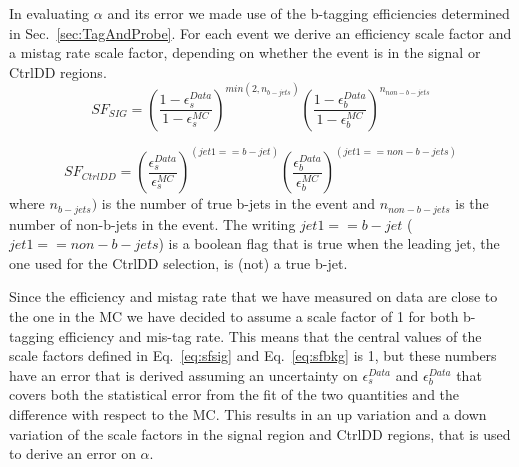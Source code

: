 In evaluating $\alpha$ and its error we made use of the b-tagging efficiencies determined in Sec.~\ref{sec:TagAndProbe}. 
For each event we derive an efficiency scale factor and a mistag rate scale factor, depending on whether the event is in the signal or CtrlDD regions.
\begin{equation}
\label{eq:sfsig}
SF_{SIG} = \left(\frac{1-\epsilon_{s}^{Data}}{1-\epsilon_{s}^{MC}}\right)^{min(2, n_{b-jets})} \left(\frac{1-\epsilon_{b}^{Data}}{1-\epsilon_{b}^{MC}}\right)^{n_{non-b-jets}} 
\end{equation}

\begin{equation}
\label{eq:sfbkg}
SF_{CtrlDD} = \left(\frac{\epsilon_{s}^{Data}}{\epsilon_{s}^{MC}}\right)^{(jet1 == b-jet)} \left(\frac{\epsilon_{b}^{Data}}{\epsilon_{b}^{MC}}\right)^{(jet1 == non-b-jets)} 
\end{equation}
where $n_{b-jets})$ is the number of true b-jets in the event and $n_{non-b-jets}$ is the number of non-b-jets in the event. The writing $jet1 == b-jet$ ($jet1 == non-b-jets$) is a boolean flag that is true when the leading jet, the one used for the CtrlDD selection, is (not) a true b-jet.

Since the efficiency and mistag rate that we have measured on data are close to the one in the MC we have decided to assume a scale factor of 1 for both b-tagging efficiency and mis-tag rate. This means that the central values of the scale factors defined in Eq.~\ref{eq:sfsig} and Eq.~\ref{eq:sfbkg} is 1, but these numbers have an error that is derived assuming an uncertainty on $\epsilon_{s}^{Data}$ and $\epsilon_{b}^{Data}$ that covers both the statistical error from the fit of the two quantities and the difference with respect to the MC.
This results in an up variation and a down variation of the scale factors in the signal region and CtrlDD regions, that is used to derive an error on $\alpha$.

